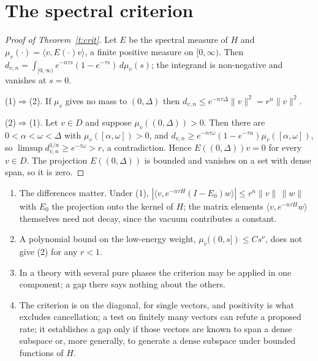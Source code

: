 \section{The spectral criterion}\label{s:crit}
\begin{proof}[Proof of Theorem~\ref{t:crit}]
Let $E$ be the spectral measure of $H$ and $\mu_v(\cdot)=\langle v,E(\cdot)v\rangle$, a finite positive measure
on $[0,\infty)$. Then $d_{v,n}=\int_{[0,\infty)}e^{-n\tau s}(1-e^{-\tau s})\,d\mu_v(s)$; the integrand is
non-negative and vanishes at $s=0$.

(1)$\Rightarrow$(2). If $\mu_v$ gives no mass to $(0,\Delta)$ then $d_{v,n}\le e^{-n\tau\Delta}\|v\|^2=r^n\|v\|^2$.

(2)$\Rightarrow$(1). Let $v\in D$ and suppose $\mu_v((0,\Delta))>0$. Then there are $0<\alpha<\omega<\Delta$ with
$\mu_v([\alpha,\omega])>0$, and $d_{v,n}\ge e^{-n\tau\omega}(1-e^{-\tau\alpha})\mu_v([\alpha,\omega])$, so
$\limsup d_{v,n}^{1/n}\ge e^{-\tau\omega}>r$, a contradiction. Hence $E((0,\Delta))v=0$ for every $v\in D$.
The projection $E((0,\Delta))$ is bounded and vanishes on a set with dense span, so it is zero.
\end{proof}

\begin{remark}\label{r:crit}
\leavevmode
\begin{enumerate}
\item[(a)] The differences matter. Under (1), $|\langle v,e^{-n\tau H}(I-E_0)w\rangle|\le r^n\|v\|\,\|w\|$ with $E_0$ the
projection onto the kernel of $H$; the matrix elements $\langle v,e^{-n\tau H}w\rangle$ themselves need not decay,
since the vacuum contributes a constant.
\item[(b)] A polynomial bound on the low-energy weight,
$\mu_v((0,s])\le Cs^\nu$, does not give (2) for any $r<1$.
\item[(c)] In a theory with several pure phases the criterion
may be applied in one component; a gap there says nothing about the others.
\item[(d)] The criterion is on the
diagonal, for single vectors, and positivity is what excludes cancellation; a test on finitely many vectors
can refute a proposed rate; it establishes a gap only if those vectors are known to span a dense subspace or, more generally, to
generate a dense subspace under bounded functions of $H$.
\end{enumerate}
\end{remark}

